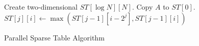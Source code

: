 \begin{algorithm}[!thb]
\SetAlgoNoLine
{}

Create two-dimensional $ST[\log N][N]$. \;
Copy $A$ to $ST[0]$. \;
 {
   {
    $ST[j][i] \gets \max(ST[j-1][i-2^{j}], ST[j-1][i])$ \;
  }
}
  \caption{Parallel Sparse Table Algorithm}
  \label{alg:parallel-sparse-table}
\end{algorithm}